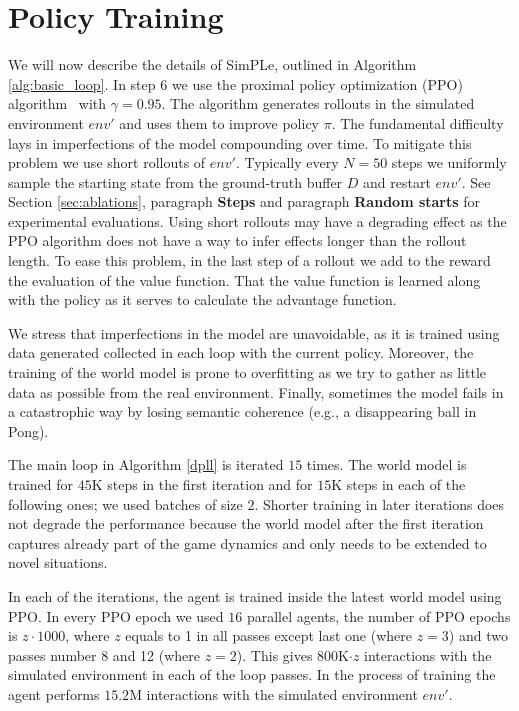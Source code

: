 \section{Policy Training} \label{sec:policy_training}
We will now describe the details of SimPLe, outlined in Algorithm \ref{alg:basic_loop}.  In step 6 we use the proximal policy optimization (PPO) algorithm~\cite{ppo} with $\gamma=0.95$. The algorithm generates rollouts in the simulated environment $env'$ and uses them to improve policy $\pi$. The fundamental difficulty lays in imperfections of the model compounding over time. To mitigate this problem we use short rollouts of $env'$. Typically every $N=50$ steps we uniformly sample the starting state from the ground-truth buffer $D$ and restart $env'$. See Section \ref{sec:ablations}, paragraph {\bf Steps} and paragraph {\bf Random starts} for experimental evaluations. Using short rollouts may have a degrading effect as the PPO algorithm does not have a way to infer effects longer than the rollout length. To ease this problem, in the last step of a rollout we add to the reward the evaluation of the value function. That the value function is learned along with the policy as it serves to calculate the advantage function.

We stress that imperfections in the model are unavoidable, as it is trained using data generated collected in each loop with the current policy. Moreover, the training of the world model is prone to overfitting as we try to gather as little data as possible from the real environment. Finally, sometimes the model fails in a catastrophic way by losing semantic coherence (e.g., a disappearing ball in Pong).

The main loop in Algorithm \ref{dpll} is iterated $15$ times. The world model is trained for $45$K steps in the first iteration and for $15$K steps in each of the following ones; we used batches of size $2$. Shorter training in later iterations does not degrade the performance because the world model after the first iteration captures already part of the game dynamics and only needs to be extended to novel situations.

In each of the iterations, the agent is trained inside the latest world model using PPO. In every PPO epoch we used $16$ parallel agents, the number of PPO epochs is $z\cdot 1000$, where $z$ equals to 1 in all passes except last one (where $z = 3$) and two passes number 8 and 12 (where $z = 2$). This gives $800$K$\cdot z$ interactions with the simulated environment in each of the loop passes. In the process of training the agent performs  $15.2$M interactions with the simulated environment $env'$.
